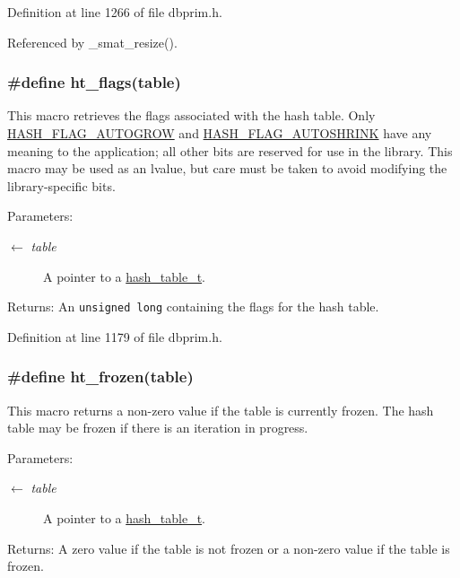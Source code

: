 Definition at line 1266 of file dbprim.h.

Referenced by \_\-smat\_\-resize().\hypertarget{group__dbprim__hash_ga28}{
\subsubsection[ht\_\-flags]{\setlength{\rightskip}{0pt plus 5cm}\#define ht\_\-flags(table)}}
\label{group__dbprim__hash_ga28}


This macro retrieves the flags associated with the hash table. Only \hyperlink{group__dbprim__hash_ga23}{HASH\_\-FLAG\_\-AUTOGROW} and \hyperlink{group__dbprim__hash_ga24}{HASH\_\-FLAG\_\-AUTOSHRINK} have any meaning to the application; all other bits are reserved for use in the library. This macro may be used as an lvalue, but care must be taken to avoid modifying the library-specific bits.

\begin{Desc}
\item[Parameters:]
\begin{description}
\item[\mbox{$\leftarrow$} {\em table}]A pointer to a \hyperlink{group__dbprim__hash_ga1}{hash\_\-table\_\-t}.\end{description}
\end{Desc}
\begin{Desc}
\item[Returns:]An {\tt unsigned long} containing the flags for the hash table.\end{Desc}


Definition at line 1179 of file dbprim.h.\hypertarget{group__dbprim__hash_ga29}{
\subsubsection[ht\_\-frozen]{\setlength{\rightskip}{0pt plus 5cm}\#define ht\_\-frozen(table)}}
\label{group__dbprim__hash_ga29}


This macro returns a non-zero value if the table is currently frozen. The hash table may be frozen if there is an iteration in progress.

\begin{Desc}
\item[Parameters:]
\begin{description}
\item[\mbox{$\leftarrow$} {\em table}]A pointer to a \hyperlink{group__dbprim__hash_ga1}{hash\_\-table\_\-t}.\end{description}
\end{Desc}
\begin{Desc}
\item[Returns:]A zero value if the table is not frozen or a non-zero value if the table is frozen.\end{Desc}


